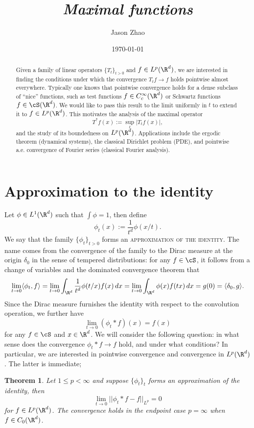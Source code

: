 \documentclass[reqno]{amsart}
\title
{
	\emph{Maximal functions}
}
\author{Jason Zhao}
\date{\today}
\newtheorem{theorem}{Theorem}
\theoremstyle{definition}
\theoremstyle{remark}
\renewcommand{\emph}{\textsc}
\begin{document}
\maketitle

\begin{abstract}
	Given a family of linear operators $\{T_t\}_{t > 0}$ and $f \in L^p (\R^d)$, we are interested in finding the conditions under which the convergence $T_t f \to f$ holds pointwise almost everywhere. Typically one knows that pointwise convergence holds for a dense subclass of ``nice'' functions, such as test functions $f \in C^\infty_c (\R^d)$ or Schwartz functions $f \in \cS(\R^d)$. We would like to pass this result to the limit uniformly in $t$ to extend it to $f \in L^p (\R^d)$. This motivates the analysis of the maximal operator 
		\[ T^* f(x) := \sup_t |T_t f(x)|, \]
	and the study of its boundedness on $L^p (\R^d)$. Applications include the ergodic theorem (dynamical systems), the classical Dirichlet problem (PDE), and pointwise a.e. convergence of Fourier series (classical Fourier analysis). 
\end{abstract}

\tableofcontents

\section{Approximation to the identity}

Let $\phi \in L^1 (\R^d)$ such that $\int \phi = 1$, then define
	\[ \phi_t (x) := \frac{1}{t^d} \phi(x/t). \]
We say that the family $\{ \phi_t  \}_{t > 0}$ forms an \emph{approximation of the identity}. The name comes from the convergence of the family to the Dirac measure at the origin $\delta_0$ in the sense of tempered distributions: for any $f\in \cS$, it follows from a change of variables and the dominated convergence theorem that
	\[ \lim_{t \to 0} \langle \phi_t, f \rangle = \lim_{t \to 0} \int_{\R^d} \frac{1}{t^d} \phi(t/x) f(x) \, dx =  \lim_{t \to 0}\int_{\R^d} \phi(x) f(tx) \, dx = g(0) = \langle \delta_0, g \rangle.  \]
Since the Dirac measure furnishes the identity with respect to the convolution operation, we further have
	\[ \lim_{t \to 0} (\phi_t * f)(x) = f(x) \]	
for any $f \in \cS$ and $x \in \R^d$. We will consider the following question: in what sense does the convergence $\phi_t * f \to f$ hold, and under what conditions? In particular, we are interested in pointwise convergence and convergence in $L^p (\R^d)$. The latter is immediate;

\begin{theorem}
	Let $1 \leq p < \infty$ and suppose $\{ \phi_t\}_t$ forms an approximation of the identity, then 
		\[ \lim_{t \to 0} ||\phi_t * f - f||_{L^p} = 0 \]
	for $f \in L^p (\R^d)$. The convergence holds in the endpoint case $p = \infty$ when $f \in C_0 (\R^d)$.
\end{theorem}
\end{document}
